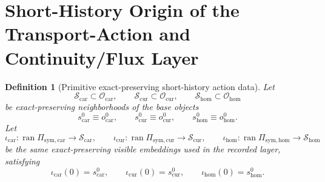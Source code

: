 \documentclass[11pt]{article}
\newcommand{\TensorSymProj}{\Pi_{\mathrm{sym,car}}}
\newcommand{\CurSymProj}{\Pi_{\mathrm{sym,cur}}}
\newcommand{\HomSymProj}{\Pi_{\mathrm{sym,hom}}}
\newcommand{\TensorStateManifold}{\mathcal S_{\mathrm{car}}}
\newcommand{\CurStateManifold}{\mathcal S_{\mathrm{cur}}}
\newcommand{\HomStateManifold}{\mathcal S_{\mathrm{hom}}}
\newcommand{\TensorStateBase}{s_{\mathrm{car}}^{0}}
\newcommand{\CurStateBase}{s_{\mathrm{cur}}^{0}}
\newcommand{\HomStateBase}{s_{\mathrm{hom}}^{0}}
\newcommand{\TensorStateEmbed}{\iota_{\mathrm{car}}}
\newcommand{\CurStateEmbed}{\iota_{\mathrm{cur}}}
\newcommand{\HomStateEmbed}{\iota_{\mathrm{hom}}}
\newcommand{\TensorObjClass}{\mathcal O_{\mathrm{car}}}
\newcommand{\CurObjClass}{\mathcal O_{\mathrm{cur}}}
\newcommand{\HomObjClass}{\mathcal O_{\mathrm{hom}}}
\newcommand{\TensorObjBase}{o_{\mathrm{car}}^0}
\newcommand{\CurObjBase}{o_{\mathrm{cur}}^0}
\newcommand{\HomObjBase}{o_{\mathrm{hom}}^0}
\newtheorem{definition}{Definition}
\begin{document}
\section{Short-History Origin of the Transport-Action and Continuity/Flux Layer}

\begin{definition}[Primitive exact-preserving short-history action data]
\label{def:primitive_history_action}
Let
\[
\TensorStateManifold\subset\TensorObjClass,\qquad
\CurStateManifold\subset\CurObjClass,\qquad
\HomStateManifold\subset\HomObjClass
\]
be exact-preserving neighborhoods of the base objects
\[
\TensorStateBase\equiv\TensorObjBase,\qquad
\CurStateBase\equiv\CurObjBase,\qquad
\HomStateBase\equiv\HomObjBase.
\]
Let
\[
\TensorStateEmbed:\operatorname{ran}\TensorSymProj\to\TensorStateManifold,\qquad
\CurStateEmbed:\operatorname{ran}\CurSymProj\to\CurStateManifold,\qquad
\HomStateEmbed:\operatorname{ran}\HomSymProj\to\HomStateManifold
\]
be the same exact-preserving visible embeddings used in the recorded layer, satisfying
\begin{equation}
\TensorStateEmbed(0)=\TensorStateBase,\qquad
\CurStateEmbed(0)=\CurStateBase,\qquad
\HomStateEmbed(0)=\HomStateBase.
\label{eq:history_embed_zero}
\end{equation}


\end{definition}
\end{document}
